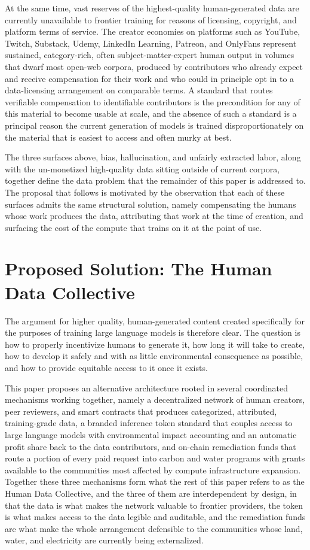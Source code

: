 \documentclass[10pt,a4paper,twocolumn]{article}
\begin{document}
At the same time, vast reserves of the highest-quality human-generated data are currently unavailable to frontier training for reasons of licensing, copyright, and platform terms of service. The creator economies on platforms such as YouTube, Twitch, Substack, Udemy, LinkedIn Learning, Patreon, and OnlyFans represent sustained, category-rich, often subject-matter-expert human output in volumes that dwarf most open-web corpora, produced by contributors who already expect and receive compensation for their work and who could in principle opt in to a data-licensing arrangement on comparable terms. A standard that routes verifiable compensation to identifiable contributors is the precondition for any of this material to become usable at scale, and the absence of such a standard is a principal reason the current generation of models is trained disproportionately on the material that is easiest to access and often murky at best.

The three surfaces above, bias, hallucination, and unfairly extracted labor, along with the un-monetized high-quality data sitting outside of current corpora, together define the data problem that the remainder of this paper is addressed to. The proposal that follows is motivated by the observation that each of these surfaces admits the same structural solution, namely compensating the humans whose work produces the data, attributing that work at the time of creation, and surfacing the cost of the compute that trains on it at the point of use.

\section{Proposed Solution: The Human Data Collective}
\label{sec:hdc}

The argument for higher quality, human-generated content created specifically for the purposes of training large language models is therefore clear. The question is how to properly incentivize humans to generate it, how long it will take to create, how to develop it safely and with as little environmental consequence as possible, and how to provide equitable access to it once it exists.

This paper proposes an alternative architecture rooted in several coordinated mechanisms working together, namely a decentralized network of human creators, peer reviewers, and smart contracts that produces categorized, attributed, training-grade data, a branded inference token standard that couples access to large language models with environmental impact accounting and an automatic profit share back to the data contributors, and on-chain remediation funds that route a portion of every paid request into carbon and water programs with grants available to the communities most affected by compute infrastructure expansion. Together these three mechanisms form what the rest of this paper refers to as the Human Data Collective, and the three of them are interdependent by design, in that the data is what makes the network valuable to frontier providers, the token is what makes access to the data legible and auditable, and the remediation funds are what make the whole arrangement defensible to the communities whose land, water, and electricity are currently being externalized.
\end{document}
